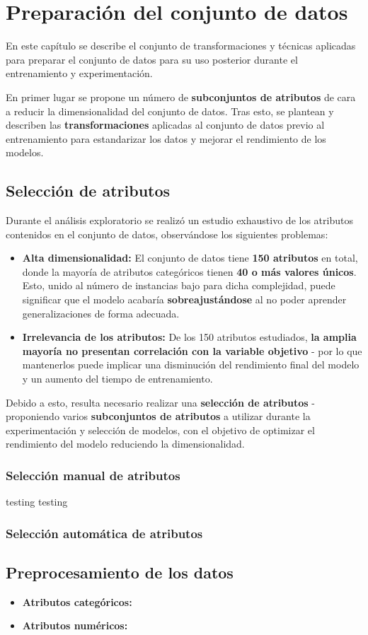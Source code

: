 \chapter{Preparación del conjunto de datos}

En este capítulo se describe el conjunto de transformaciones y técnicas aplicadas para preparar el conjunto de datos para su uso posterior durante el entrenamiento y experimentación.

En primer lugar se propone un número de \textbf{subconjuntos de atributos} de cara a reducir la dimensionalidad del conjunto de datos. Tras esto, se plantean y describen las \textbf{transformaciones} aplicadas al conjunto de datos previo al entrenamiento para estandarizar los datos y mejorar el rendimiento de los modelos.


\section{Selección de atributos}

Durante el análisis exploratorio se realizó un estudio exhaustivo de los atributos contenidos en el conjunto de datos, observándose los siguientes problemas:

\begin{itemize}
	\item \textbf{Alta dimensionalidad:} El conjunto de datos tiene \textbf{150 atributos} en total, donde la mayoría de atributos categóricos tienen \textbf{40 o más valores únicos}. Esto, unido al número de instancias bajo para dicha complejidad, puede significar que el modelo acabaría \textbf{sobreajustándose} al no poder aprender generalizaciones de forma adecuada.
	\item \textbf{Irrelevancia de los atributos:} De los 150 atributos estudiados, \textbf{la amplia mayoría no presentan correlación con la variable objetivo} - por lo que mantenerlos puede implicar una disminución del rendimiento final del modelo y un aumento del tiempo de entrenamiento.
\end{itemize}

Debido a esto, resulta necesario realizar una \textbf{selección de atributos} - proponiendo varios \textbf{subconjuntos de atributos} a utilizar durante la experimentación y selección de modelos, con el objetivo de optimizar el rendimiento del modelo reduciendo la dimensionalidad.

\subsection{Selección manual de atributos}

testing testing

\subsection{Selección automática de atributos}

\section{Preprocesamiento de los datos}

\begin{itemize}[leftmargin=*]
	\item \textbf{Atributos categóricos:}
	
	\item \textbf{Atributos numéricos:}
\end{itemize}